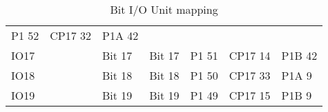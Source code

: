 \begin{table}[H]
\begin{adjustbox}{width=1\textwidth}
\begin{tabular}{|lllllll|}
  \multicolumn{1}{l|}{P1 52} &
  \multicolumn{1}{l|}{CP17 32} &
  P1A 42 \\
\multicolumn{1}{|l|}{IO17} &
  \multicolumn{1}{l|}{} &
  \multicolumn{1}{l|}{Bit 17} &
  \multicolumn{1}{l|}{Bit 17} &
  \multicolumn{1}{l|}{P1 51} &
  \multicolumn{1}{l|}{CP17 14} &
  P1B 42 \\
\multicolumn{1}{|l|}{IO18} &
  \multicolumn{1}{l|}{} &
  \multicolumn{1}{l|}{Bit 18} &
  \multicolumn{1}{l|}{Bit 18} &
  \multicolumn{1}{l|}{P1 50} &
  \multicolumn{1}{l|}{CP17 33} &
  P1A 9 \\
\multicolumn{1}{|l|}{IO19} &
  \multicolumn{1}{l|}{} &
  \multicolumn{1}{l|}{Bit 19} &
  \multicolumn{1}{l|}{Bit 19} &
  \multicolumn{1}{l|}{P1 49} &
  \multicolumn{1}{l|}{CP17 15} &
  P1B 9 \\ \hline
\end{tabular}
\end{adjustbox}
\caption{Bit I/O Unit mapping}
\label{I/O Unit mapping}
\end{table}